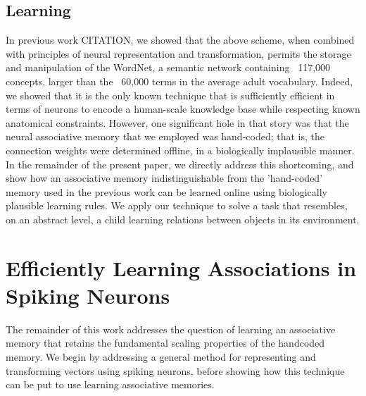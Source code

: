 \documentclass[10pt,letterpaper]{article}
\begin{document}
\subsection{Learning}
In previous work CITATION, we showed that the above scheme, when combined with principles of neural representation and transformation, permits the storage and manipulation of the WordNet, a semantic network containing ~117,000 concepts, larger than the ~60,000 terms in the average adult vocabulary. Indeed, we showed that it is the only known technique that is sufficiently efficient in terms of neurons to encode a human-scale knowledge base while respecting known anatomical constraints. However, one significant hole in that story was that the neural associative memory that we employed was hand-coded; that is, the connection weights were determined offline, in a biologically implausible manner. In the remainder of the present paper, we directly address this shortcoming, and show how an associative memory indistinguishable from the 'hand-coded' memory used in the previous work can be learned online using biologically plausible learning rules. We apply our technique to solve a task that resembles, on an abstract level, a child learning relations between objects in its environment.

\section{Efficiently Learning Associations in Spiking Neurons}
The remainder of this work addresses the question of learning an associative memory that retains the fundamental scaling properties of the handcoded memory. We begin by addressing a general method for representing and transforming vectors using spiking neurons, before showing how this technique can be put to use learning associative memories.
\end{document}

